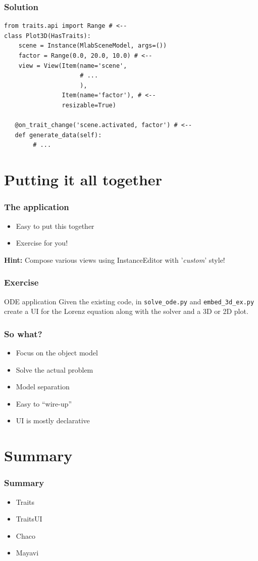 \documentclass[14pt,compress]{beamer}
\newcommand{\typ}[1]{\lstinline{#1}}
\begin{document}
\begin{frame}
\frametitle{Solution}
\footnotesize
\begin{lstlisting}
from traits.api import Range # <--
class Plot3D(HasTraits):
    scene = Instance(MlabSceneModel, args=())
    factor = Range(0.0, 20.0, 10.0) # <--
    view = View(Item(name='scene', 
                     # ...
                     ),
                Item(name='factor'), # <--
                resizable=True)

   @on_trait_change('scene.activated, factor') # <--
   def generate_data(self):
        # ...
\end{lstlisting}
\end{frame}

\section{Putting it all together}

\begin{frame}
  \frametitle{The application}
  \begin{itemize}
      \item Easy to put this together
      \item Exercise for you!
  \end{itemize}
\vspace{0.5in}
{\footnotesize \textbf{Hint:} Compose various views using InstanceEditor with '\emph{custom}' style!}
\end{frame}

\begin{frame}[plain]
    \frametitle{Exercise}
\normalsize
  \begin{block}{ODE application}
  Given the existing code, in \typ{solve_ode.py} and \typ{embed_3d_ex.py}
  create a UI for the Lorenz equation along with the solver and a 3D or 2D plot.
  \end{block}
\end{frame}


\begin{frame}
  \frametitle{So what?}
  \begin{itemize}
      \item Focus on the object model
      \item Solve the actual problem
      \item Model separation
      \item Easy to ``wire-up''
      \item UI is mostly declarative
 \end{itemize}
\end{frame}



\section{Summary}

\begin{frame}
  \frametitle{Summary}
  \begin{itemize}
      \item Traits
      \item TraitsUI
      \item Chaco
      \item Mayavi
 \end{itemize}
\end{frame}
\end{document}
